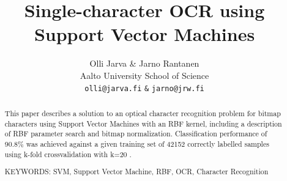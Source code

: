 \documentclass{netsec2012}
\begin{document}

\title{Single-character OCR using Support Vector Machines}

\author{Olli Jarva \& Jarno Rantanen \\
        Aalto University School of Science \\
        \texttt{olli@jarva.fi} \texttt{\&} \texttt{jarno@jrw.fi}}
\maketitle


\begin{abstract}

This paper describes a solution to an optical character recognition problem for bitmap characters
using Support Vector Machines with an RBF kernel, including a description of RBF parameter search
and bitmap normalization.  Classification performance of 90.8\% was achieved against a given
training set of 42152 correctly labelled samples using k-fold crossvalidation with k=20
\cite{training_set}.

\vspace{3mm}
\noindent KEYWORDS: SVM, Support Vector Machine, RBF, OCR, Character Recognition

\end{abstract}





\end{document}

